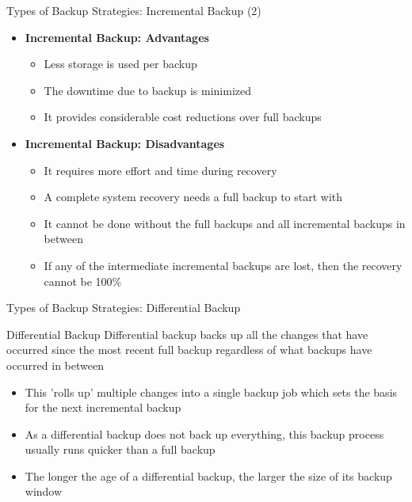 \documentclass[aspectratio=169, xcolor=dvipsnames]{beamer}
\begin{document}
\begin{frame}{Types of Backup Strategies: Incremental Backup (2)}
    \begin{itemize}[<+->]
        \item \textbf{Incremental Backup: Advantages}
        \begin{itemize}
            \item[$\triangleright$] Less storage is used per backup
            \item[$\triangleright$] The downtime due to backup is minimized
            \item[$\triangleright$] It provides considerable cost reductions over full backups
        \end{itemize}
        \item \textbf{Incremental Backup: Disadvantages}
        \begin{itemize}
            \item[$\triangleright$] It requires more effort and time during recovery
            \item[$\triangleright$] A complete system recovery needs a full backup to start with
            \item[$\triangleright$] It cannot be done without the full backups and all incremental backups in between
            \item[$\triangleright$] If any of the intermediate incremental backups are lost, then the recovery cannot be 100\%
        \end{itemize}
    \end{itemize}
\end{frame}

\begin{frame}{Types of Backup Strategies: Differential Backup}
    \begin{block}{Differential Backup}
        Differential backup backs up all the changes that have occurred since the most recent full backup regardless of what backups have occurred in between
    \end{block}
    \begin{itemize}[<+->]
        \item This 'rolls up' multiple changes into a single backup job which sets the basis for the next incremental backup
        \item As a differential backup does not back up everything, this backup process usually runs quicker than a full backup
        \item The longer the age of a differential backup, the larger the size of its backup window
    \end{itemize}
\end{frame}
\end{document}
